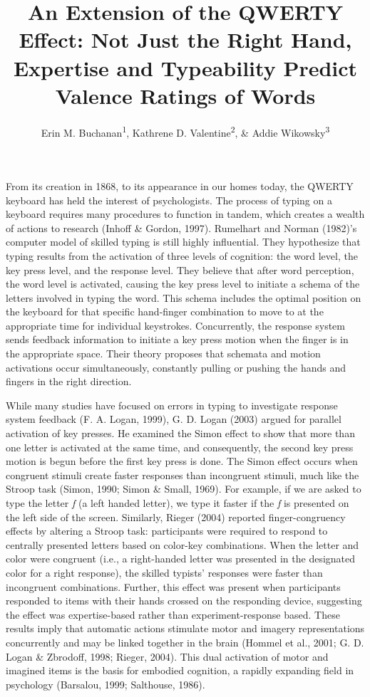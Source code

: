 \documentclass[
  english,
  man]{apa7}
\title{An Extension of the QWERTY Effect: Not Just the Right Hand, Expertise and Typeability Predict Valence Ratings of Words}
\author{Erin M. Buchanan\textsuperscript{1}, Kathrene D. Valentine\textsuperscript{2}, \& Addie Wikowsky\textsuperscript{3}}
\date{}
\affiliation{\vspace{0.5cm}\textsuperscript{1} Missouri State University\\\textsuperscript{2} Massachusetts General Hospital\\\textsuperscript{3} Clinvest Research, LLC}
\begin{document}
\maketitle

From its creation in 1868, to its appearance in our homes today, the QWERTY keyboard has held the interest of psychologists. The process of typing on a keyboard requires many procedures to function in tandem, which creates a wealth of actions to research (Inhoff \& Gordon, 1997). Rumelhart and Norman (1982)'s computer model of skilled typing is still highly influential. They hypothesize that typing results from the activation of three levels of cognition: the word level, the key press level, and the response level. They believe that after word perception, the word level is activated, causing the key press level to initiate a schema of the letters involved in typing the word. This schema includes the optimal position on the keyboard for that specific hand-finger combination to move to at the appropriate time for individual keystrokes. Concurrently, the response system sends feedback information to initiate a key press motion when the finger is in the appropriate space. Their theory proposes that schemata and motion activations occur simultaneously, constantly pulling or pushing the hands and fingers in the right direction.

While many studies have focused on errors in typing to investigate response system feedback (F. A. Logan, 1999), G. D. Logan (2003) argued for parallel activation of key presses. He examined the Simon effect to show that more than one letter is activated at the same time, and consequently, the second key press motion is begun before the first key press is done. The Simon effect occurs when congruent stimuli create faster responses than incongruent stimuli, much like the Stroop task (Simon, 1990; Simon \& Small, 1969). For example, if we are asked to type the letter \emph{f} (a left handed letter), we type it faster if the \emph{f} is presented on the left side of the screen. Similarly, Rieger (2004) reported finger-congruency effects by altering a Stroop task: participants were required to respond to centrally presented letters based on color-key combinations. When the letter and color were congruent (i.e., a right-handed letter was presented in the designated color for a right response), the skilled typists' responses were faster than incongruent combinations. Further, this effect was present when participants responded to items with their hands crossed on the responding device, suggesting the effect was expertise-based rather than experiment-response based. These results imply that automatic actions stimulate motor and imagery representations concurrently and may be linked together in the brain (Hommel et al., 2001; G. D. Logan \& Zbrodoff, 1998; Rieger, 2004). This dual activation of motor and imagined items is the basis for embodied cognition, a rapidly expanding field in psychology (Barsalou, 1999; Salthouse, 1986).
\end{document}
